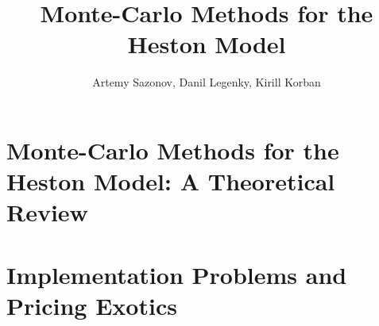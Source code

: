 \documentclass{vegareport}
\title{Monte-Carlo Methods for the Heston Model}
\author{Artemy Sazonov, Danil Legenky, Kirill Korban}
\begin{document}
    \maketitle

    \introduction
        
    
    \part{Monte-Carlo Methods for the Heston Model: A Theoretical Review}
        

    \part{Implementation Problems and Pricing Exotics}
        
    
    \conclusion
        

\end{document}
